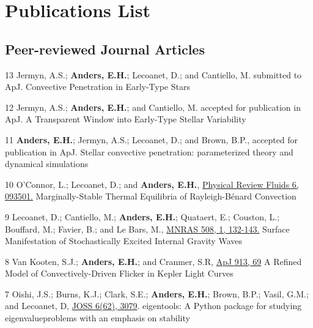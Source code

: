 \section{Publications List}

\subsection{Peer-reviewed Journal Articles}

	  {13}
	  {
		Jermyn, A.S.; \textbf{Anders, E.H.}; Lecoanet, D.; and Cantiello, M. submitted to ApJ.
	  }
	  {Convective Penetration in Early-Type Stars}

\cvpub{}
	  {12}
	  {
		Jermyn, A.S.; \textbf{Anders, E.H.}; and Cantiello, M. accepted for publication in ApJ.
	  }
	  {A Transparent Window into Early-Type Stellar Variability}

	  {11}
	  {
		\textbf{Anders, E.H.}; Jermyn, A.S.; Lecoanet, D.; and Brown, B.P., accepted for publication in ApJ.
	  }
	  {Stellar convective penetration: parameterized theory and dynamical simulations}

\cvpub{}
	  {10}
	  {
		O'Connor, L.; Lecoanet, D.; and \textbf{Anders, E.H.}, 
		  \href{https://journals.aps.org/prfluids/abstract/10.1103/PhysRevFluids.6.093501}{Physical Review Fluids 6, 093501.}
	  }
	  {Marginally-Stable Thermal Equilibria of Rayleigh-B\'{e}nard Convection}

\cvpub{}
	  {9}
	  {
		Lecoanet, D.; Cantiello, M.; \textbf{Anders, E.H.}; Quataert, E.; Couston, L.; Bouffard, M.; Favier, B.; and Le Bars, M.,
          \href{https://doi.org/10.1093/mnras/stab2524}{MNRAS 508, 1, 132-143.}
	  }
	  {Surface Manifestation of Stochastically Excited Internal Gravity Waves}

\cvpub{}
	  {8}
	  {
		 Van Kooten, S.J.; \textbf{Anders, E.H.}; and Cranmer, S.R,
		  \href{https://iopscience.iop.org/article/10.3847/1538-4357/abf7bf}{ApJ 913, 69}
	  }
	  {A Refined Model of Convectively-Driven Flicker in Kepler Light Curves}

\cvpub{}
	  {7}
	  {
		Oishi, J.S.; Burns, K.J.; Clark, S.E.; \textbf{Anders, E.H.}; Brown, B.P.; Vasil, G.M.; and Lecoanet, D,
		  \href{https://joss.theoj.org/papers/10.21105/joss.03079}{JOSS 6(62), 3079}.
	  }
	  {eigentools: A Python package for studying eigenvalueproblems with an emphasis on stability}

